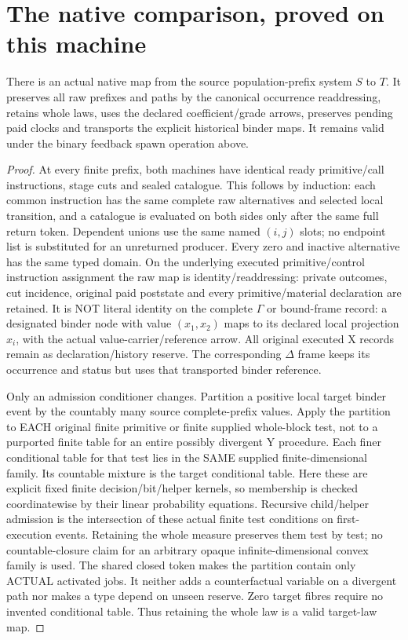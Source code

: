 \documentclass{article}
\begin{document}
\section{The native comparison, proved on this machine}
\begin{theorem}
There is an actual native map from the source population-prefix system $S$ to $T$. It preserves all raw prefixes and paths by the canonical occurrence readdressing, retains whole laws, uses the declared coefficient/grade arrows, preserves pending paid clocks and transports the explicit historical binder maps. It remains valid under the binary feedback spawn operation above.
\end{theorem}
\begin{proof}
At every finite prefix, both machines have identical ready primitive/call instructions, stage cuts and sealed catalogue. This follows by induction: each common instruction has the same complete raw alternatives and selected local transition, and a catalogue is evaluated on both sides only after the same full return token. Dependent unions use the same named $(i,j)$ slots; no endpoint list is substituted for an unreturned producer. Every zero and inactive alternative has the same typed domain. On the underlying executed primitive/control instruction assignment the raw map is identity/readdressing: private outcomes, cut incidence, original paid poststate and every primitive/material declaration are retained. It is NOT literal identity on the complete $\Gamma$ or bound-frame record: a designated binder node with value $(x_1,x_2)$ maps to its declared local projection $x_i$, with the actual value-carrier/reference arrow. All original executed X records remain as declaration/history reserve. The corresponding $\Delta$ frame keeps its occurrence and status but uses that transported binder reference.

Only an admission conditioner changes. Partition a positive local target binder event by the countably many source complete-prefix values. Apply the partition to EACH original finite primitive or finite supplied whole-block test, not to a purported finite table for an entire possibly divergent Y procedure. Each finer conditional table for that test lies in the SAME supplied finite-dimensional family. Its countable mixture is the target conditional table. Here these are explicit fixed finite decision/bit/helper kernels, so membership is checked coordinatewise by their linear probability equations. Recursive child/helper admission is the intersection of these actual finite test conditions on first-execution events. Retaining the whole measure preserves them test by test; no countable-closure claim for an arbitrary opaque infinite-dimensional convex family is used. The shared closed token makes the partition contain only ACTUAL activated jobs. It neither adds a counterfactual variable on a divergent path nor makes a type depend on unseen reserve. Zero target fibres require no invented conditional table. Thus retaining the whole law is a valid target-law map.


\end{proof}
\end{document}
